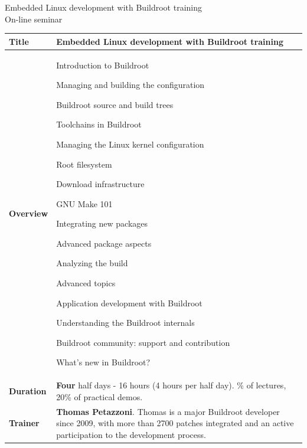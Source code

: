 \documentclass[a4paper,12pt,obeyspaces,spaces,hyphens]{article}
\begin{document}
\thispagestyle{fancy}

\setlength{\arrayrulewidth}{0.8pt}

\begin{center}
\LARGE
Embedded Linux development with Buildroot training\\
\large
On-line seminar
\end{center}
\vspace{1cm}

\small
{}

 {
  \begin{tabularx}{\textwidth}{|g|h|}
    {\bf Title} & {\bf Embedded Linux development with Buildroot training} \\
    \hline

    {\bf Overview} &
    Introduction to Buildroot \par
    Managing and building the configuration \par
    Buildroot source and build trees \par
    Toolchains in Buildroot \par
    Managing the Linux kernel configuration \par
    Root filesystem \par
    Download infrastructure \par
    GNU Make 101 \par
    Integrating new packages \par
    Advanced package aspects \par
    Analyzing the build \par
    Advanced topics \par
    Application development with Buildroot \par
    Understanding the Buildroot internals \par
    Buildroot community: support and contribution \par
    What's new in Buildroot? \\
    \hline

    {\bf Duration} & {\bf Four} half days - 16 hours (4 hours per half day).
    \% of lectures, 20\% of practical demos. \\
    \hline

    {\bf Trainer} & {\bf Thomas Petazzoni}. Thomas is a major
    Buildroot developer since 2009, with more than 2700 patches
    integrated and an active participation to the development process.\\
    \hline


\end{tabularx}}
\end{document}
